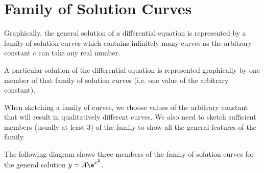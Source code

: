 \section{Family of Solution Curves}

Graphically, the general solution of a differential equation is represented by a family of solution curves which contains infinitely many curves as the arbitrary constant $c$ can take any real number.

A particular solution of the differential equation is represented graphically by one member of that family of solution curves (i.e. one value of the arbitrary constant).

When sketching a family of curves, we choose values of the arbitrary constant that will result in qualitatively different curves. We also need to sketch sufficient members (usually at least 3) of the family to show all the general features of the family.

\begin{example}
    The following diagram shows three members of the family of solution curves for the general solution $y = A\e^{x^2}$.

    \begin{figure}[H]
        \centering
        \caption{}
    \end{figure}
\end{example}

